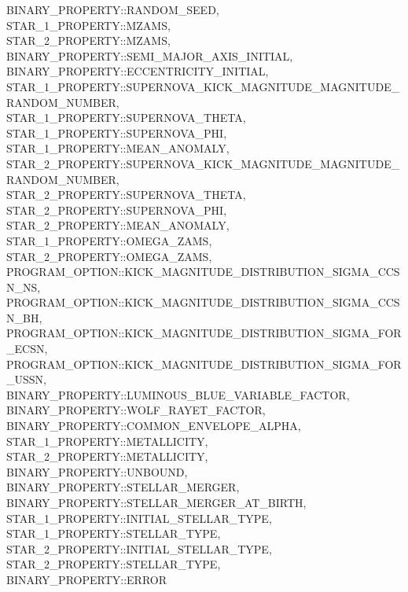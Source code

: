 \hfill
\begin{minipage}{\dimexpr\textwidth-2em}
    BINARY\_PROPERTY::RANDOM\_SEED, \\
    STAR\_1\_PROPERTY::MZAMS, \\
    STAR\_2\_PROPERTY::MZAMS, \\
    BINARY\_PROPERTY::SEMI\_MAJOR\_AXIS\_INITIAL, \\
    BINARY\_PROPERTY::ECCENTRICITY\_INITIAL, \\
    STAR\_1\_PROPERTY::SUPERNOVA\_KICK\_MAGNITUDE\_MAGNITUDE\_RANDOM\_NUMBER, \\
    STAR\_1\_PROPERTY::SUPERNOVA\_THETA, \\
    STAR\_1\_PROPERTY::SUPERNOVA\_PHI, \\
    STAR\_1\_PROPERTY::MEAN\_ANOMALY, \\
    STAR\_2\_PROPERTY::SUPERNOVA\_KICK\_MAGNITUDE\_MAGNITUDE\_RANDOM\_NUMBER, \\
    STAR\_2\_PROPERTY::SUPERNOVA\_THETA, \\
    STAR\_2\_PROPERTY::SUPERNOVA\_PHI, \\
    STAR\_2\_PROPERTY::MEAN\_ANOMALY, \\
    STAR\_1\_PROPERTY::OMEGA\_ZAMS, \\
    STAR\_2\_PROPERTY::OMEGA\_ZAMS, \\
    PROGRAM\_OPTION::KICK\_MAGNITUDE\_DISTRIBUTION\_SIGMA\_CCSN\_NS, \\
    PROGRAM\_OPTION::KICK\_MAGNITUDE\_DISTRIBUTION\_SIGMA\_CCSN\_BH, \\
    PROGRAM\_OPTION::KICK\_MAGNITUDE\_DISTRIBUTION\_SIGMA\_FOR\_ECSN, \\
    PROGRAM\_OPTION::KICK\_MAGNITUDE\_DISTRIBUTION\_SIGMA\_FOR\_USSN, \\
    BINARY\_PROPERTY::LUMINOUS\_BLUE\_VARIABLE\_FACTOR, \\
    BINARY\_PROPERTY::WOLF\_RAYET\_FACTOR, \\
    BINARY\_PROPERTY::COMMON\_ENVELOPE\_ALPHA, \\
    STAR\_1\_PROPERTY::METALLICITY, \\
    STAR\_2\_PROPERTY::METALLICITY, \\
    BINARY\_PROPERTY::UNBOUND, \\
    BINARY\_PROPERTY::STELLAR\_MERGER, \\
    BINARY\_PROPERTY::STELLAR\_MERGER\_AT\_BIRTH, \\
    STAR\_1\_PROPERTY::INITIAL\_STELLAR\_TYPE, \\
    STAR\_1\_PROPERTY::STELLAR\_TYPE, \\
    STAR\_2\_PROPERTY::INITIAL\_STELLAR\_TYPE, \\
    STAR\_2\_PROPERTY::STELLAR\_TYPE, \\
    BINARY\_PROPERTY::ERROR
\end{minipage}
\par\rcb{;}

